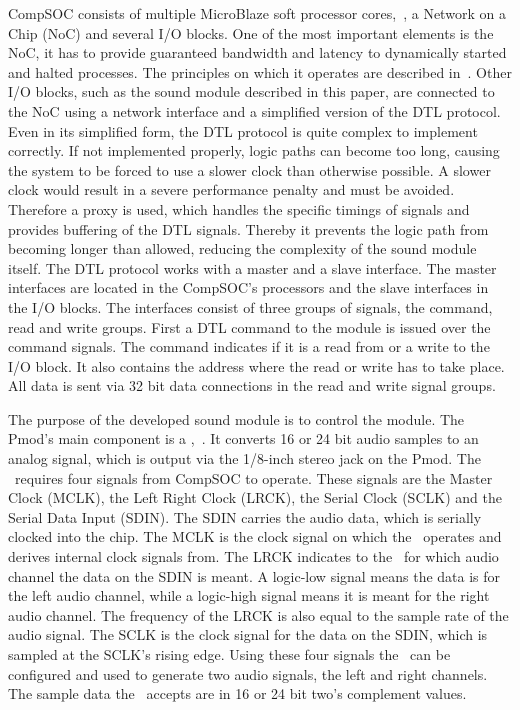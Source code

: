 CompSOC consists of multiple MicroBlaze soft processor cores,~\cite{microblaze}, a Network on a Chip (NoC) and several I/O blocks. One of the most important elements is the NoC, it has to provide guaranteed bandwidth and latency to dynamically started and halted processes. The principles on which it operates are described in~\cite{hansson2011chip}. Other I/O blocks, such as the sound module described in this paper, are connected to the NoC using a network interface and a simplified version of the DTL protocol. Even in its simplified form, the DTL protocol is quite complex to implement correctly. If not implemented properly, logic paths can become too long, causing the system to be forced to use a slower clock than otherwise possible. A slower clock would result in a severe performance penalty and must be avoided. Therefore a proxy is used, which handles the specific timings of signals and provides buffering of the DTL signals. Thereby it prevents the logic path from becoming longer than allowed, reducing the complexity of the sound module itself. The DTL protocol works with a master and a slave interface. The master interfaces are located in the CompSOC's processors and the slave interfaces in the I/O blocks. The interfaces consist of three groups of signals, the command, read and write groups. First a DTL command to the module is issued over the command signals. The command indicates if it is a read from or a write to the I/O block. It also contains the address where the read or write has to take place. All data is sent via 32 bit data connections in the read and write signal groups.

The purpose of the developed sound module is to control the \pmodfull module. The Pmod's main component is a \cirruslogic,~\cite{cirruslogic}. It converts 16 or 24 bit audio samples to an analog signal, which is output via the 1/8-inch stereo jack on the Pmod. The \cs~requires four signals from CompSOC to operate. These signals are the Master Clock (MCLK), the Left Right Clock (LRCK), the Serial Clock (SCLK) and the Serial Data Input (SDIN). The SDIN carries the audio data, which is serially clocked into the chip. The MCLK is the clock signal on which the \cs~operates and derives internal clock signals from. The LRCK  indicates to the \cs~for which audio channel the data on the SDIN is meant. A logic-low signal means the data is for the left audio channel, while a logic-high signal means it is meant for the right audio channel. The frequency of the LRCK is also equal to the sample rate of the audio signal. The SCLK is the clock signal for the data on the SDIN, which is sampled at the SCLK's rising edge. Using these four signals the \cs~can be configured and used to generate two audio signals, the left and right channels. The sample data the \cs~accepts are in 16 or 24 bit two's complement values.

